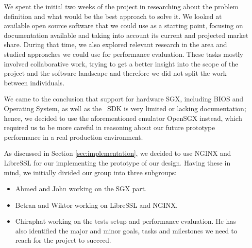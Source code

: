 \documentclass[../main.tex]{subfiles}
\begin{document}

We spent the initial two weeks of the project in researching about the problem
definition and what would be the best approach to solve it. We looked at
available open source software that we could use as a starting point, focusing
on documentation available and taking into account its current and projected
market share. During that time, we also explored relevant research in the area
and studied approaches we could use for performance evaluation. These tasks
mostly involved collaborative work, trying to get a better insight into the
scope of the project and the software landscape and therefore we did not split
the work between individuals.

We came to the conclusion that support for hardware SGX, including BIOS and
Operating System, as well as the \Intel~SDK is very limited or lacking
documentation; hence, we decided to use the aforementioned emulator OpenSGX
instead, which required us to be more careful in reasoning about our future
prototype performance in a real production environment.

As discussed in Section \ref{sec:implementation}, we decided to use NGINX and
LibreSSL for our implementing the prototype of our design. Having these in
mind, we initially divided our group into three subgroups:

\begin{itemize}
	\item Ahmed and John working on the SGX part.
	\item Betran and Wiktor working on LibreSSL and NGINX.
	\item Chiraphat working on the tests setup and performance evaluation.
          He has also identified the major and minor goals, tasks and
          milestones we need to reach for the project to succeed. %
\end{itemize}


\end{document}
